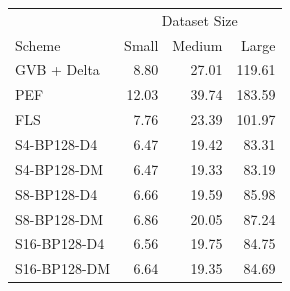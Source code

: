 \begin{tabular}{lrrr}
\toprule
 & \multicolumn{3}{c}{Dataset Size} \\
Scheme & Small & Medium & Large \\
\midrule
GVB + Delta & 8.80 & 27.01 & 119.61 \\
PEF & 12.03 & 39.74 & 183.59 \\
FLS & 7.76 & 23.39 & 101.97 \\
S4-BP128-D4 & 6.47 & 19.42 & 83.31 \\
S4-BP128-DM & 6.47 & 19.33 & 83.19 \\
S8-BP128-D4 & 6.66 & 19.59 & 85.98 \\
S8-BP128-DM & 6.86 & 20.05 & 87.24 \\
S16-BP128-D4 & 6.56 & 19.75 & 84.75 \\
S16-BP128-DM & 6.64 & 19.35 & 84.69 \\
\bottomrule
\end{tabular}

